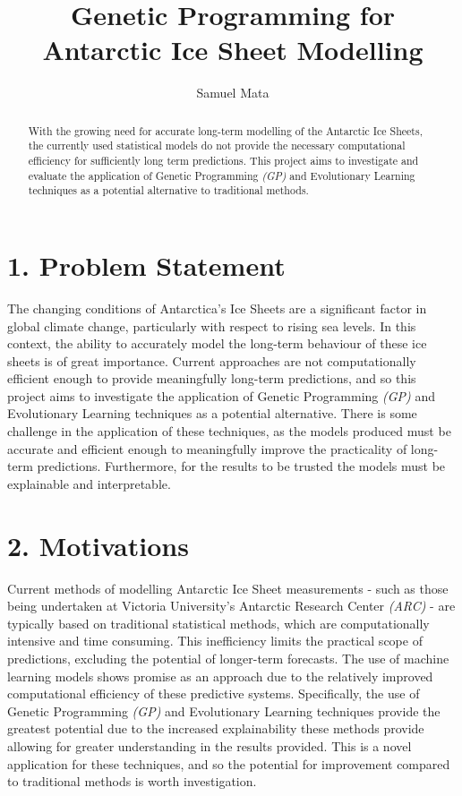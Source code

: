\documentclass[11pt, a4paper, twoside, openright]{report}
\title{Genetic Programming for Antarctic Ice Sheet Modelling}
\author{Samuel Mata}
\date{}
\begin{document}
\frontmatter

\begin{abstract}
  With the growing need for accurate long-term modelling of
  the Antarctic Ice Sheets, the currently used statistical
  models do not provide the necessary computational 
  efficiency for sufficiently long term predictions. This
  project aims to investigate and evaluate the application
  of Genetic Programming \textit{(GP)} and Evolutionary
  Learning techniques as a potential alternative to 
  traditional methods.
\end{abstract}


\maketitle
\mainmatter


\section*{1. Problem Statement}

The changing conditions of Antarctica's Ice Sheets are a 
significant factor in global climate change, particularly
with respect to rising sea levels. In this context, the
ability to accurately model the long-term behaviour of
these ice sheets is of great importance. Current approaches
are not computationally efficient enough to provide
meaningfully long-term predictions, and so this project
aims to investigate the application of Genetic Programming
\textit{(GP)} and  Evolutionary Learning techniques as a
potential alternative. There is some challenge in the
application of these techniques, as the models produced
must be accurate and efficient enough to meaningfully
improve the practicality of long-term predictions.
Furthermore, for the results to be trusted
the models must be explainable and interpretable.


\section*{2. Motivations}

Current methods of modelling Antarctic Ice Sheet measurements 
- such as those being undertaken at Victoria University's Antarctic 
Research Center \textit{(ARC)} - are typically based on
traditional statistical methods, which are computationally
intensive and time consuming. This inefficiency limits the
practical scope of predictions, excluding the potential of
longer-term forecasts. The use of machine learning models
shows promise as an approach due to the relatively improved 
computational efficiency of these predictive systems. 
Specifically, the use of Genetic Programming \textit{(GP)} 
and Evolutionary Learning techniques provide the 
greatest potential due to the increased explainability
these methods provide allowing for greater understanding in
the results provided. This is a novel application for
these techniques, and so the potential for improvement
compared to traditional methods is worth investigation.
\end{document}
